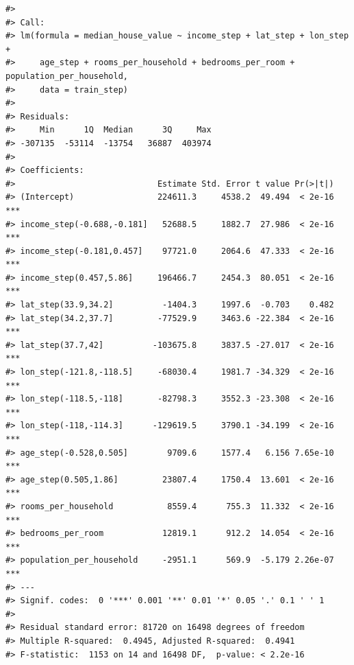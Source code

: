 \documentclass[
]{article}
\begin{document}
\begin{verbatim}
#> 
#> Call:
#> lm(formula = median_house_value ~ income_step + lat_step + lon_step + 
#>     age_step + rooms_per_household + bedrooms_per_room + population_per_household, 
#>     data = train_step)
#> 
#> Residuals:
#>     Min      1Q  Median      3Q     Max 
#> -307135  -53114  -13754   36887  403974 
#> 
#> Coefficients:
#>                             Estimate Std. Error t value Pr(>|t|)    
#> (Intercept)                 224611.3     4538.2  49.494  < 2e-16 ***
#> income_step(-0.688,-0.181]   52688.5     1882.7  27.986  < 2e-16 ***
#> income_step(-0.181,0.457]    97721.0     2064.6  47.333  < 2e-16 ***
#> income_step(0.457,5.86]     196466.7     2454.3  80.051  < 2e-16 ***
#> lat_step(33.9,34.2]          -1404.3     1997.6  -0.703    0.482    
#> lat_step(34.2,37.7]         -77529.9     3463.6 -22.384  < 2e-16 ***
#> lat_step(37.7,42]          -103675.8     3837.5 -27.017  < 2e-16 ***
#> lon_step(-121.8,-118.5]     -68030.4     1981.7 -34.329  < 2e-16 ***
#> lon_step(-118.5,-118]       -82798.3     3552.3 -23.308  < 2e-16 ***
#> lon_step(-118,-114.3]      -129619.5     3790.1 -34.199  < 2e-16 ***
#> age_step(-0.528,0.505]        9709.6     1577.4   6.156 7.65e-10 ***
#> age_step(0.505,1.86]         23807.4     1750.4  13.601  < 2e-16 ***
#> rooms_per_household           8559.4      755.3  11.332  < 2e-16 ***
#> bedrooms_per_room            12819.1      912.2  14.054  < 2e-16 ***
#> population_per_household     -2951.1      569.9  -5.179 2.26e-07 ***
#> ---
#> Signif. codes:  0 '***' 0.001 '**' 0.01 '*' 0.05 '.' 0.1 ' ' 1
#> 
#> Residual standard error: 81720 on 16498 degrees of freedom
#> Multiple R-squared:  0.4945, Adjusted R-squared:  0.4941 
#> F-statistic:  1153 on 14 and 16498 DF,  p-value: < 2.2e-16
\end{verbatim}
\end{document}
